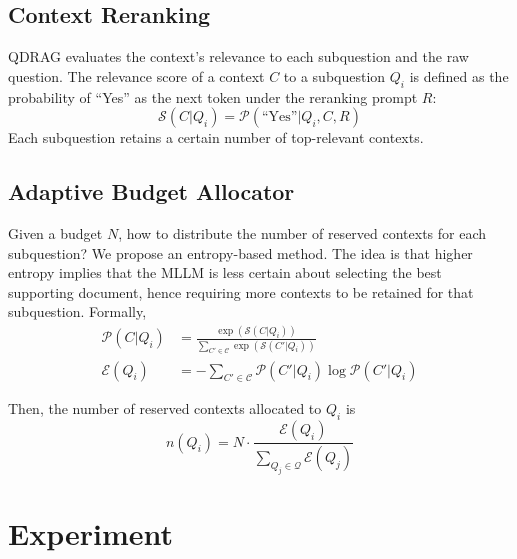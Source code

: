 \documentclass[letterpaper]{article} %
\begin{document}
\subsection{Context Reranking}


QDRAG evaluates the context's relevance to each subquestion and the raw question. The relevance score of a context $C$ to a subquestion $Q_i$ is defined as the probability of ``Yes'' as the next token under the reranking prompt $R$:
\[
    \mathcal{S}(C|Q_i)=\mathcal{P}(\text{``Yes''}|Q_i,C,R)
\]
Each subquestion retains a certain number of top-relevant contexts. 

\subsection{Adaptive Budget Allocator}

Given a budget $N$, how to distribute the number of reserved contexts for each subquestion? We propose an entropy-based method. The idea is that higher entropy implies that the MLLM is less certain about selecting the best supporting document, hence requiring more contexts to be retained for that subquestion.
Formally, 
\[
\begin{aligned}
\mathcal{P}(C|Q_i)&=\frac{\exp(\mathcal{S}(C|Q_i))}{\sum_{C'\in \mathcal{C}}\exp(\mathcal{S}(C'|Q_i))} \\
\mathcal{E}(Q_i)&=-\sum_{C'\in \mathcal{C}}\mathcal{P}(C'|Q_i)\log \mathcal{P}(C'|Q_i)
\end{aligned}
\]

Then, the number of reserved contexts allocated to $Q_i$ is 
\[
n(Q_i)=N\cdot\frac{\mathcal{E}(Q_i)}{\sum_{Q_j\in\mathcal{Q}}\mathcal{E}(Q_j)}
\]


\section{Experiment} \label{sec:exp}


\end{document}
